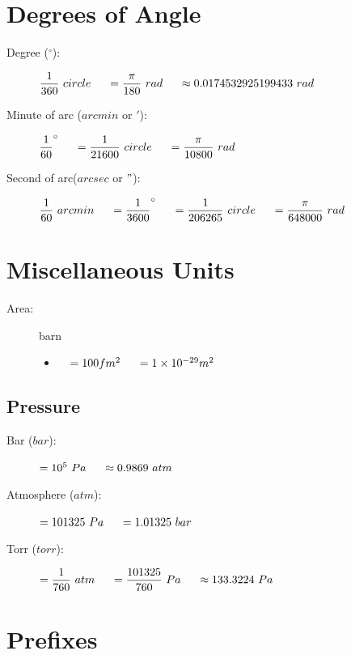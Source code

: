 \documentclass[]{report}
\newcommand \tab[1][1cm]{\hspace*{#1}}
\newcommand{\items}{\item\ \ }
\newcommand{\degrees}{^{\circ}}
\begin{document}
			
\section{Degrees of Angle}
\begin{description}

\item[Degree ($\degrees$):] \( \dfrac{1}{360}\ circle \tab[0.5cm]= \dfrac{\pi}{180}\ rad \tab[0.5cm] \approx 0.0174532925199433\ rad \)

\item[Minute of arc ($arcmin$ or $'$):] \( \dfrac{1}{60}\degrees \tab[0.5cm] =\dfrac{1}{21600}\ circle \tab[0.5cm] =\dfrac{\pi}{10800}\ rad \)

\item[Second of arc($arcsec$ or $"$):] $\dfrac{1}{60}\ arcmin \tab[0.5cm]=\dfrac{1}{3600} \degrees\tab[0.5cm]=\dfrac{1}{206265}\ circle \tab[0.5cm]=\dfrac{\pi}{648000}\  rad$
\end{description}
            
\section{Miscellaneous Units}

\begin{description}
\item[Area:] barn
\begin{itemize}
\items $= 100 fm^2 \tab[0.5cm] = 1\times 10^{-29}m^2$
\end{itemize}
\end{description}

\subsection{Pressure}
\begin{description}

\item[Bar ($bar$):] $ =10^5\ Pa \tab[0.5cm] \approx 0.9869\ atm $

\item[Atmosphere ($atm$):] $ =101325\ Pa \tab[0.5cm] = 1.01325\ bar $

\item[Torr ($torr$):] $ = \dfrac{1}{760}\ atm \tab[0.5cm]= \dfrac{101325}{760}\ Pa \tab[0.5cm]\approx 133.3224\ Pa $
\end{description}
			
\section{Prefixes}
\end{document}
